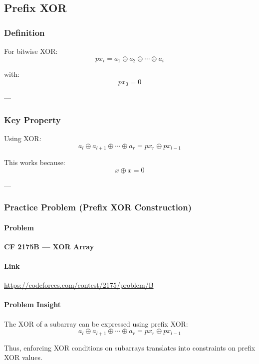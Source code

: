 \documentclass[11pt]{article}
\begin{document}
\subsection{Prefix XOR}

\subsubsection{Definition}

For bitwise XOR:
\[
px_i = a_1 \oplus a_2 \oplus \cdots \oplus a_i
\]

with:
\[
px_0 = 0
\]

---

\subsubsection{Key Property}

Using XOR:
\[
a_l \oplus a_{l+1} \oplus \cdots \oplus a_r
=
px_r \oplus px_{l-1}
\]

This works because:
\[
x \oplus x = 0
\]

---

\subsubsection{Practice Problem (Prefix XOR Construction)}

\paragraph{Problem}
\textbf{CF 2175B — XOR Array}

\paragraph{Link}
\url{https://codeforces.com/contest/2175/problem/B}

\paragraph{Problem Insight}

The XOR of a subarray can be expressed using prefix XOR:
\[
a_l \oplus a_{l+1} \oplus \cdots \oplus a_r
=
px_r \oplus px_{l-1}
\]

Thus, enforcing XOR conditions on subarrays translates into constraints
on prefix XOR values.
\end{document}
